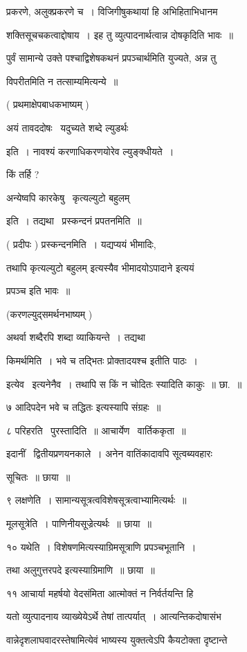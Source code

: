 \documentclass[11pt, openany]{book}
\begin{document}
प्रकरणे, अलुक्प्रकरणे च~। विजिगीषुकथायां हि अभिहिताभिधानम \textendash\ 

शक्तिसूचचकत्वाद्दोषाय~। इह तु व्युत्पादनार्थत्वान्न दोषकृदिति भावः~॥ 

पुर्वं सामान्ये उक्ते पश्चाद्विशेषकथनं प्रपञ्चार्थमिति युज्यते, अन्न
तु 

विपरीतमिति न तत्साम्यमित्यन्ये~॥

( प्रथमाक्षेपबाधकभाष्यम् ) 

अयं तावददोषः \textendash\ यदुच्यते शब्दे ल्युडर्थः

इति~। नावश्यं करणाधिकरणयोरेव ल्युङ्क्धीयते~। 

किं तर्हि ? 

अन्येष्वपि कारकेषु \textendash\ {\qt कृत्यल्युटो बहुलम्} 

इति~। तद्यथा \textendash\ प्रस्कन्दनं प्रपतनमिति~॥ 

( प्रदीपः ) प्रस्कन्दनमिति~। यद्यप्ययं भीमादिः, 

तथापि कृत्यल्युटो बहुलम् {\qt इत्यस्यैव भीमादयोऽपादाने} इत्ययं 

प्रपञ्च इति भावः~॥ 

(करणल्युद्समर्थनभाष्यम् ) 

अथर्वा शब्दैरपि शब्दा व्याकियन्ते~। तद्यथा \textendash\ 

किमर्थमिति~। भवे च तद्भितः {\qt प्रोक्तादयश्च} इतीति पाठः~। 

इत्येव \textendash\ इत्यनेनैव~। तथापि स किं न चोदितः स्यादिति काकुः~॥ छा.~॥ 

७ {\qt आदिपदेन भवे च तद्धितः} इत्यस्यापि संग्रहः~॥ 

८ परिहरति \textendash\ पुरस्तादिति~॥ आचार्येण \textendash\ वार्तिककृता~॥ 

इदानीं \textendash\ द्वितीयप्रणयनकाले~। अनेन वातिंकादावपि सूत्वब्यवहारः 

सूचितः~॥ छाया~॥ 

९ लक्षणेति~। सामान्यसूत्रत्वविशेषसूत्रत्वाभ्यामित्यर्थः~॥ 

मूलसूत्रेति~। पाणिनीयसूज्रेत्यर्थः~॥ छाया~॥ 

१० यथेति~। विशेषणमित्यस्याग्रिमसूत्राणि प्रपञ्चभूतानि~। 

तथा {\qt अलुगुत्तरपदे} इत्यस्याग्रिमाणि~॥ छाया~॥ 

११ आचार्या महर्षयो वेदसंमिता आत्मोक्तं न निर्वर्तयन्ति हि 

यतो व्युत्पादनाय व्याख्येयेऽर्थे तेषां तात्पर्यात्~। आत्यन्तिकदोषासंभ \textendash\ 


वान्नेदृशलाघवादरस्तेषामित्येवं भाष्यस्य युक्तत्वेऽपि कैयटोक्ता
दृष्टान्ते \textendash\ 
\end{document}
